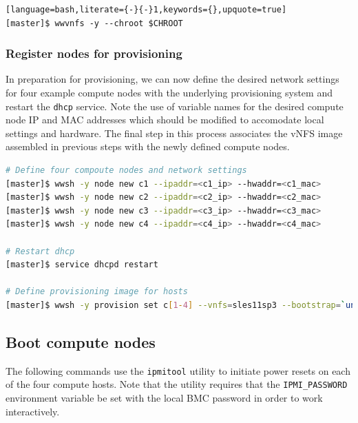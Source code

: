 \documentclass[letterpaper]{article}
\begin{document}
\begin{lstlisting}[language=bash,literate={-}{-}1,keywords={},upquote=true]
[master]$ wwvnfs -y --chroot $CHROOT
\end{lstlisting}

\subsubsection{Register nodes for provisioning}

In preparation for provisioning, we can now define the desired network settings
for four example compute nodes with the underlying provisioning system and
restart the \texttt{dhcp} service. Note the use of variable names for the
desired compute node IP and MAC addresses which should be modified to
accomodate local settings and hardware. The final step in this process
associates the vNFS image assembled in previous steps with the newly defined
compute nodes.


\begin{lstlisting}[language=bash,keywords={},upquote=true,basicstyle=\footnotesize\ttfamily]
# Define four compoute nodes and network settings 
[master]$ wwsh -y node new c1 --ipaddr=<c1_ip> --hwaddr=<c1_mac> 
[master]$ wwsh -y node new c2 --ipaddr=<c2_ip> --hwaddr=<c2_mac> 
[master]$ wwsh -y node new c3 --ipaddr=<c3_ip> --hwaddr=<c3_mac> 
[master]$ wwsh -y node new c4 --ipaddr=<c4_ip> --hwaddr=<c4_mac> 

# Restart dhcp 
[master]$ service dhcpd restart

# Define provisioning image for hosts
[master]$ wwsh -y provision set c[1-4] --vnfs=sles11sp3 --bootstrap=`uname -r`
\end{lstlisting}

\subsection{Boot compute nodes}

 
The following commands use the \texttt{ipmitool} utility to initiate power
resets on each of the four compute hosts. Note that the utility requires that
the \texttt{IPMI\_PASSWORD} environment variable be set with the local BMC password in
order to work interactively.

\end{document}

